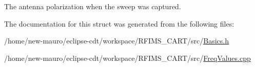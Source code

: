 The antenna polarization when the sweep was captured. 

The documentation for this struct was generated from the following files\+:\begin{DoxyCompactItemize}
\item 
/home/new-\/mauro/eclipse-\/cdt/workspace/\+R\+F\+I\+M\+S\+\_\+\+C\+A\+R\+T/src/\hyperlink{Basics_8h}{Basics.\+h}\item 
/home/new-\/mauro/eclipse-\/cdt/workspace/\+R\+F\+I\+M\+S\+\_\+\+C\+A\+R\+T/src/\hyperlink{FreqValues_8cpp}{Freq\+Values.\+cpp}\end{DoxyCompactItemize}
